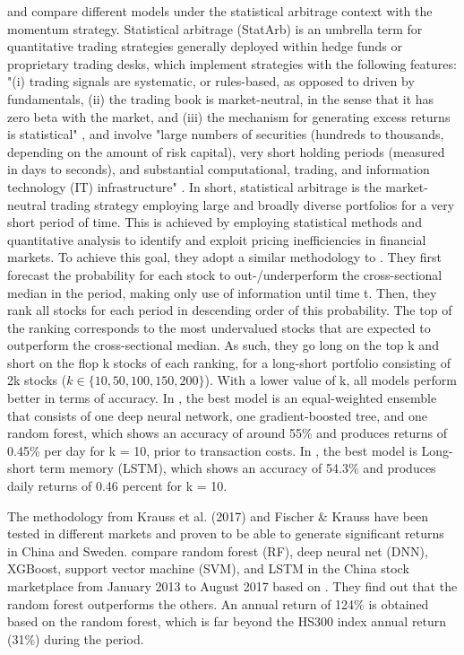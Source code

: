 \documentclass{article}
\begin{document}
\cite{krauss2017deep} and \cite{fischer2018deep} compare different models under the statistical arbitrage context with the momentum strategy. Statistical arbitrage (StatArb) is an umbrella term for quantitative trading strategies generally deployed within hedge funds or proprietary trading desks, which implement strategies with the following features: "(i) trading signals are systematic, or rules-based, as opposed to driven by fundamentals, (ii) the trading book is market-neutral, in the sense that it has zero beta with the market, and (iii) the mechanism for generating excess returns is statistical" \citep{avellaneda2010statistical}, and involve "large numbers of securities (hundreds to thousands, depending on the amount of risk capital), very short holding periods (measured in days to seconds), and substantial computational, trading, and information technology (IT) infrastructure" \citep{lo2010hedge}. In short, statistical arbitrage is the market-neutral trading strategy employing large and broadly diverse portfolios for a very short period of time. This is achieved by employing statistical methods and quantitative analysis to identify and exploit pricing inefficiencies in financial markets. To achieve this goal, they adopt a similar methodology to \cite{takeuchi2013applying}. They first forecast the probability for each stock to out-/underperform the cross-sectional median in the period, making only use of information until time t. Then, they rank all stocks for each period in descending order of this probability. The top of the ranking corresponds to the most undervalued stocks that are expected to outperform the cross-sectional median. As such, they go long on the top k and short on the flop k stocks of each ranking, for a long-short portfolio consisting of 2k stocks ($k \in \{10, 50, 100, 150, 200\}$). With a lower value of k, all models perform better in terms of accuracy. In \cite{krauss2017deep}, the best model is an equal-weighted ensemble that consists of one deep neural network, one gradient-boosted tree, and one random forest, which shows an accuracy of around 55\% and produces returns of 0.45\% per day for k = 10, prior to transaction costs. In \cite{fischer2018deep}, the best model is Long-short term memory (LSTM), which shows an accuracy of 54.3\% and produces daily returns of 0.46 percent for k = 10.

The methodology from Krauss et al. (2017) and Fischer \& Krauss have been tested in different markets and proven to be able to generate significant returns in China and Sweden. \cite{zhang2022statistical} compare random forest (RF), deep neural net (DNN), XGBoost, support vector machine (SVM), and LSTM in the China stock marketplace from January 2013 to August 2017 based on \cite{krauss2017deep}. They find out that the random forest outperforms the others. An annual return of 124\% is obtained based on the random forest, which is far beyond the HS300 index annual return (31\%) during the period.
\end{document}
